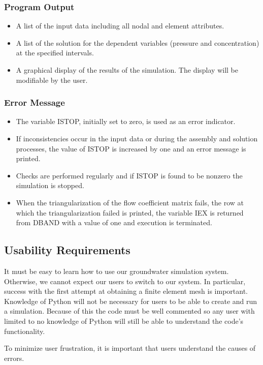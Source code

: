 \documentclass[draftclsnofoot,onecolumn,letterpaper,10pt,compsoc]{IEEEtran}
\begin{document}
\subsubsection{Program Output}
\begin{itemize}
    \item A list of the input data including all nodal and element attributes.
    \item A list of the solution for the dependent variables (pressure and concentration) at the specified intervals.
    \item A graphical display of the results of the simulation. The display will be modifiable by the user.
\end{itemize}

\subsubsection{Error Message}
\begin{itemize}
    \item The variable ISTOP, initially set to zero, is used as an error indicator.
    \item If inconsistencies occur in the input data or during the assembly and solution processes, the value of ISTOP is increased by one and an error message is printed.
    \item Checks are performed regularly and if ISTOP is found to be nonzero the simulation is stopped.
    \item When the triangularization of the flow coefficient matrix fails, the row at which the triangularization failed is printed, the variable IEX is returned from DBAND with a value of one and execution is terminated.
\end{itemize}

\subsection{Usability Requirements}
It must be easy to learn how to use our groundwater simulation system. Otherwise, we cannot expect our users to switch to our system. In particular, success with the first attempt at obtaining a finite element mesh is important. Knowledge of Python will not be necessary for users to be able to create and run a simulation. Because of this the code must be well commented so any user with limited to no knowledge of Python will still be able to understand the code's functionality.


\noindent
To minimize user frustration, it is important that users understand the causes of errors.
\end{document}
